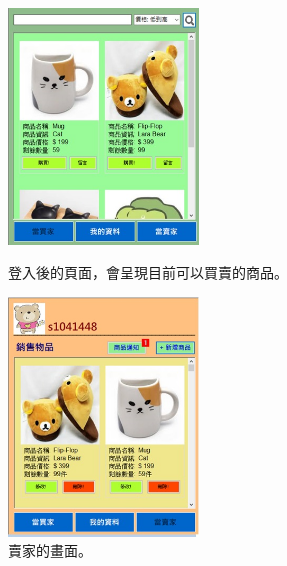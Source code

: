 \documentclass{scrreprt}
\begin{document}
\begin{CJK}{UTF8}{bkai}
\begin{figure}[t]
	\centering
	\includegraphics[width=0.45\textwidth]{search.jpg}
	\caption{登入後的頁面，會呈現目前可以買賣的商品。}
	\centering
	\includegraphics[width=0.45\textwidth]{note.jpg}
	\caption{賣家的畫面。}
\end{figure}


\end{CJK}
\end{document}
